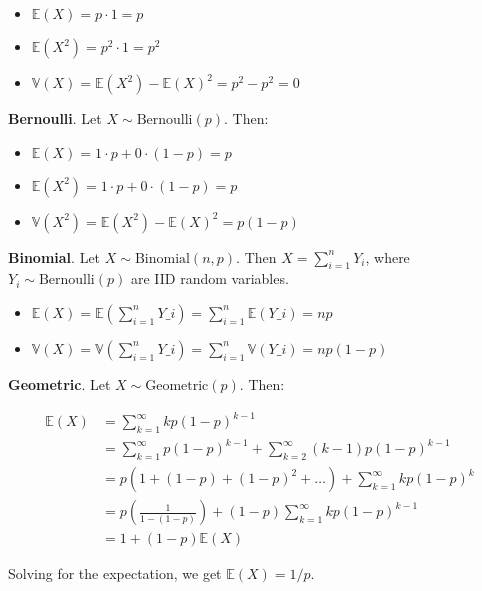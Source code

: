 \begin{itemize}[tightlist]
\item
  \(\mathbb{E}(X) = p \cdot 1 = p\)
\item
  \(\mathbb{E}(X^{2}) = p^{2} \cdot 1 = p^{2}\)
\item
  \(\mathbb{V}(X) = \mathbb{E}(X^{2}) - \mathbb{E}(X)^{2} = p^{2} - p^{2} = 0\)
\end{itemize}

\textbf{Bernoulli}. Let \(X \sim \text{Bernoulli}(p)\). Then:

\begin{itemize}[tightlist]
\item
  \(\mathbb{E}(X) = 1 \cdot p + 0 \cdot (1 - p) = p \)
\item
  \(\mathbb{E}(X^{2}) = 1 \cdot p + 0 \cdot (1 - p) = p\)
\item
  \(\mathbb{V}(X^{2}) = \mathbb{E}(X^{2}) - \mathbb{E}(X)^{2} = p(1 - p)\)
\end{itemize}

\textbf{Binomial}. Let \(X \sim \text{Binomial}(n, p)\). Then
\(X = \sum_{i=1}^{n} Y_{i}\), where \(Y_{i} \sim \text{Bernoulli}(p)\) are IID
random variables.

\begin{itemize}[tightlist]
\item
  \(\mathbb{E}(X) = \mathbb{E}\left( \sum_{i=1}^{n} Y\_{i} \right)
  = \sum_{i=1}^{n} \mathbb{E}(Y\_{i}) = np\)
\item
  \(\mathbb{V}(X) = \mathbb{V}\left(\sum_{i=1}^{n} Y\_{i} \right)
  = \sum_{i=1}^{n} \mathbb{V}(Y\_{i}) = np(1-p)\)
\end{itemize}

\textbf{Geometric}. Let \(X \sim \text{Geometric}(p)\). Then:

\begin{align*}
\mathbb{E}(X) &= \sum_{k=1}^{\infty} k p (1 - p)^{k - 1}  \\
&= \sum_{k=1}^{\infty} p(1-p)^{k-1} + \sum_{k=2}^{\infty} (k - 1) p(1-p)^{k - 1} \\
&= p \left( 1 + (1 - p) + (1 - p)^{2} + \dots \right) + \sum_{k=1}^{\infty} k p(1-p)^{k} \\
&= p \left(\frac{1}{1 - (1 - p)}\right) + (1 - p) \sum_{k=1}^{\infty} k p(1-p)^{k - 1} \\
&= 1 + (1 - p) \mathbb{E}(X)
\end{align*}

Solving for the expectation, we get \(\mathbb{E}(X) = 1/p\).

